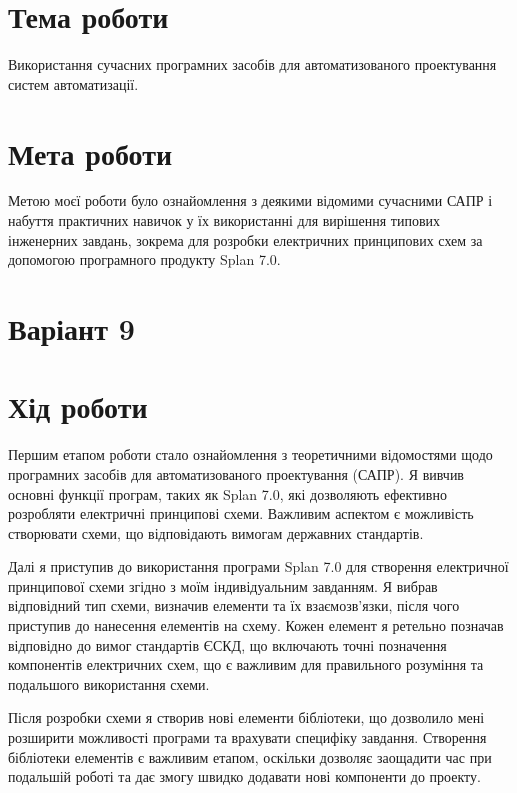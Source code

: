 \documentclass[a4paper]{article}
\begin{document}

    \section*{Тема роботи}
    Використання сучасних програмних засобів для автоматизованого проектування систем автоматизації.

    \section*{Мета роботи} 
    Метою моєї роботи було ознайомлення з деякими відомими сучасними САПР і набуття практичних навичок 
    у їх використанні для вирішення типових інженерних завдань, зокрема для розробки електричних 
    принципових схем за допомогою програмного продукту Splan 7.0.
 
    \section*{Варіант 9}

    \section*{Хід роботи}
    Першим етапом роботи стало ознайомлення з теоретичними відомостями щодо програмних засобів для 
    автоматизованого проектування (САПР). Я вивчив основні функції програм, таких як Splan 7.0, які 
    дозволяють ефективно розробляти електричні принципові схеми. Важливим аспектом є можливість 
    створювати схеми, що відповідають вимогам державних стандартів.

    Далі я приступив до використання програми Splan 7.0 для створення електричної принципової схеми 
    згідно з моїм індивідуальним завданням. Я вибрав відповідний тип схеми, визначив елементи та їх 
    взаємозв'язки, після чого приступив до нанесення елементів на схему. Кожен елемент я ретельно 
    позначав відповідно до вимог стандартів ЄСКД, що включають точні позначення компонентів електричних 
    схем, що є важливим для правильного розуміння та подальшого використання схеми.

    Після розробки схеми я створив нові елементи бібліотеки, що дозволило мені розширити можливості 
    програми та врахувати специфіку завдання. Створення бібліотеки елементів є важливим етапом, 
    оскільки дозволяє заощадити час при подальшій роботі та дає змогу швидко додавати нові компоненти 
    до проекту.
\end{document}
